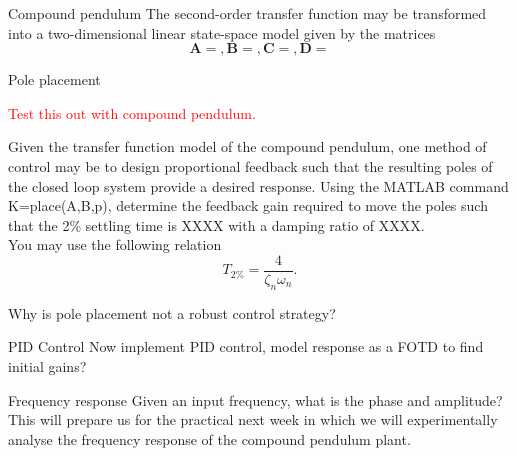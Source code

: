 \documentclass[9pt]{beamer-control}
\begin{document}
\begin{frame}{Compound pendulum}
The second-order transfer function may be transformed into a two-dimensional linear state-space model given by the matrices
\[\mathbf{A} = , \mathbf{B} = , \mathbf{C} = , \mathbf{D}=  \]
\end{frame}



\begin{frame}{Pole placement}

\textcolor{red}{Test this out with compound pendulum.}

Given the transfer function model of the compound pendulum, one method of control may be to design proportional feedback such that the resulting poles of the closed loop system provide a desired response. Using the MATLAB command K=place(A,B,p), determine the feedback gain required to move the poles such that the 2\% settling time is XXXX with a damping ratio of XXXX. \\
You may use the following relation
\[ T_{2\%} = \frac{4}{\zeta_n \omega_n}. \]

Why is pole placement not a robust control strategy?


\end{frame}


\begin{frame}{PID Control}
Now implement PID control, model response as a FOTD to find initial gains?
\end{frame}



\begin{frame}{Frequency response}
Given an input frequency, what is the phase and amplitude? \\

This will prepare us for the practical next week in which we will experimentally analyse the frequency response of the compound pendulum plant.
\end{frame}


\SUMMARYFRAME
\end{document}
